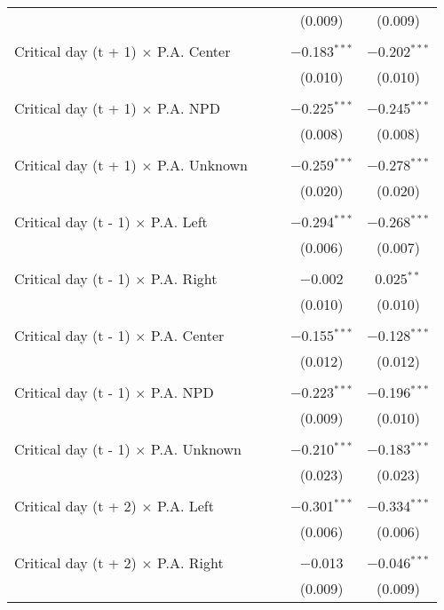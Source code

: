 \documentclass[
]{article}
\begin{document}
\begin{table}[!htbp]
{\begin{tabular}{@{\extracolsep{5pt}}lcccc}
  &  &  & (0.009) & (0.009) \\ 
  & & & & \\ 
 Critical day (t + 1) $\times$ P.A. Center &  &  & $-$0.183$^{***}$ & $-$0.202$^{***}$ \\ 
  &  &  & (0.010) & (0.010) \\ 
  & & & & \\ 
 Critical day (t + 1) $\times$ P.A. NPD &  &  & $-$0.225$^{***}$ & $-$0.245$^{***}$ \\ 
  &  &  & (0.008) & (0.008) \\ 
  & & & & \\ 
 Critical day (t + 1) $\times$ P.A. Unknown &  &  & $-$0.259$^{***}$ & $-$0.278$^{***}$ \\ 
  &  &  & (0.020) & (0.020) \\ 
  & & & & \\ 
 Critical day (t - 1) $\times$ P.A. Left &  &  & $-$0.294$^{***}$ & $-$0.268$^{***}$ \\ 
  &  &  & (0.006) & (0.007) \\ 
  & & & & \\ 
 Critical day (t - 1) $\times$ P.A. Right &  &  & $-$0.002 & 0.025$^{**}$ \\ 
  &  &  & (0.010) & (0.010) \\ 
  & & & & \\ 
 Critical day (t - 1) $\times$ P.A. Center &  &  & $-$0.155$^{***}$ & $-$0.128$^{***}$ \\ 
  &  &  & (0.012) & (0.012) \\ 
  & & & & \\ 
 Critical day (t - 1) $\times$ P.A. NPD &  &  & $-$0.223$^{***}$ & $-$0.196$^{***}$ \\ 
  &  &  & (0.009) & (0.010) \\ 
  & & & & \\ 
 Critical day (t - 1) $\times$ P.A. Unknown &  &  & $-$0.210$^{***}$ & $-$0.183$^{***}$ \\ 
  &  &  & (0.023) & (0.023) \\ 
  & & & & \\ 
 Critical day (t + 2) $\times$ P.A. Left &  &  & $-$0.301$^{***}$ & $-$0.334$^{***}$ \\ 
  &  &  & (0.006) & (0.006) \\ 
  & & & & \\ 
 Critical day (t + 2) $\times$ P.A. Right &  &  & $-$0.013 & $-$0.046$^{***}$ \\ 
  &  &  & (0.009) & (0.009) \\ 

\end{tabular}}
\end{table}
\end{document}
